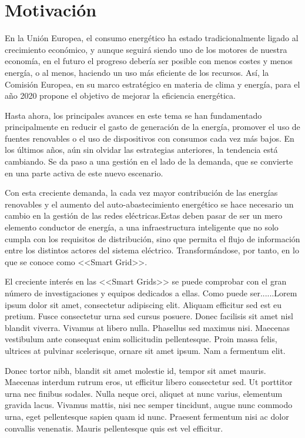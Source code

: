 \chapter{Motivación}
 En la Unión Europea, el consumo energético ha estado tradicionalmente ligado al crecimiento económico, y aunque seguirá siendo uno de los motores de nuestra economía, en el futuro el progreso debería ser posible con menos costes y menos energía, o al menos, haciendo un uso más eficiente de los recursos. Así, la Comisión Europea, en su marco estratégico en materia de clima y energía, para el año 2020 propone el objetivo de mejorar la eficiencia energética.
 
 Hasta ahora, los principales avances en este tema se han fundamentado principalmente en reducir el gasto de generación de la energía, promover el uso de fuentes renovables o el uso de dispositivos con consumos cada vez más bajos. En los últimos años, aún sin olvidar las estrategias anteriores, la tendencia está cambiando. Se da paso a una gestión en el lado de la demanda, que se convierte en una parte activa de este nuevo escenario. 
 
 Con esta creciente demanda, la cada vez mayor contribución de las energías renovables y el aumento del auto-abastecimiento energético se hace necesario un cambio en la gestión de las redes eléctricas.Estas deben pasar de ser un mero elemento conductor de energía, a una infraestructura inteligente que no solo cumpla con los requisitos de distribución, sino que permita el flujo de información entre los distintos actores del sistema eléctrico. Transformándose, por tanto, en lo que se conoce como <<Smart Grid>>.
 
 El creciente interés en las <<Smart Grids>> se puede comprobar con el gran número de investigaciones y equipos dedicados a ellas. Como puede ser......Lorem ipsum dolor sit amet, consectetur adipiscing elit. Aliquam efficitur sed est eu pretium. Fusce consectetur urna sed cursus posuere. Donec facilisis sit amet nisl blandit viverra. Vivamus at libero nulla. Phasellus sed maximus nisi. Maecenas vestibulum ante consequat enim sollicitudin pellentesque. Proin massa felis, ultrices at pulvinar scelerisque, ornare sit amet ipsum. Nam a fermentum elit.
 
 Donec tortor nibh, blandit sit amet molestie id, tempor sit amet mauris. Maecenas interdum rutrum eros, ut efficitur libero consectetur sed. Ut porttitor urna nec finibus sodales. Nulla neque orci, aliquet at nunc varius, elementum gravida lacus. Vivamus mattis, nisi nec semper tincidunt, augue nunc commodo urna, eget pellentesque sapien quam id nunc. Praesent fermentum nisi ac dolor convallis venenatis. Mauris pellentesque quis est vel efficitur.
 
